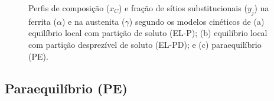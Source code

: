 \begin{figure}
	\hspace{1.5cm}
	\vspace{0pt}
	\caption{Perfis de composição ($x_C$) e fração de sítios substitucionais ($y_j$) na ferrita ($\alpha$) e na austenita ($\gamma$) segundo os modelos cinéticos de (a) equilíbrio local com partição de soluto (EL-P); (b) equilíbrio local com partição desprezível de soluto (EL-PD); e (c) paraequilíbrio (PE).}
	\label{fig:modcineticos}
\end{figure}

\subsection{Paraequilíbrio (PE)}

